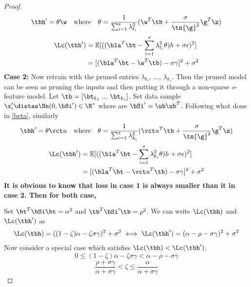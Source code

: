 \begin{proof}
{\[
\tbh'=\theta\w\quad\text{where}\quad\theta=\frac{1}{\sum_{i=1}^s\lambda_{t_i}^2}(\w^T\tb+\frac{\sigma}{\tn{\g}^2}\g^T\z)
\]
\begin{align}
    \Lc(\tbh')&=\mathbb{E}[((\bla^T\bt-\sum_{i=1}^s\lambda_{t_i}^2\theta)h+\sigma\epsilon)^2]\\
    &=[(\bla^T\bt-\w^T\tb)-\sigma\gamma]^2+\sigma^2
\end{align}
\textbf{Case 2: }
Now retrain with the pruned entries $\lambda_{k_!}$, ..., $\lambda_{k_s}$. Then the pruned model can be seen as pruning the inputs and then putting it through a non-sparse $s$-feature model. Let $\tb=[\bt_{k_1}~...~\bt_{k_s}]$. Set data sample $\x_i'\distas \Nn(0,\bSi')\in\R^s$ where are $\bSi'=\ub\ub^T$. Following what done in \ref{beta}, similarly
\[
\tbh'=\theta\vct u\quad\text{where}\quad\theta=\frac{1}{\sum_{i=1}^s\lambda_{k_i}^2}(\vct u^T\tb+\frac{\sigma}{\tn{\g}^2}\g^T\z)
\]
\begin{align}
    \Lc(\tbh')&=\mathbb{E}[((\bla^T\bt-\sum_{i=1}^s\lambda_{k_i}^2\theta)h+\sigma\epsilon)^2]\\
    &=[(\bla^T\bt-\vct u^T\tb)-\sigma\gamma]^2+\sigma^2
\end{align}
\textbf{It is obvious to know that loss in case 1 is always smaller than it in case 2. Then for both case, }

Set $\bt^T\bSi\bt=\alpha^2$ and $\tb^T\bSi'\tb=\rho^2$. We can write $\Lc(\tbh)$ and $\Lc(\tbh')$ as
\[
\Lc(\tbh)=((1-\zeta)\alpha-\zeta\sigma\gamma)^2+\sigma^2\iff\Lc(\tbh')=(\alpha-\rho-\sigma\gamma)^2+\sigma^2
\]
Now consider a special case which satisfies $\Lc(\tbh)<\Lc(\tbh')$.
\[
0\leq(1-\zeta)\alpha-\zeta\sigma\gamma<\alpha-\rho-\sigma\gamma
\]
\[
\frac{\rho+\sigma\gamma}{\alpha+\sigma\gamma}<\zeta\leq\frac{\alpha}{\alpha+\sigma\gamma}
\]}
\end{proof}